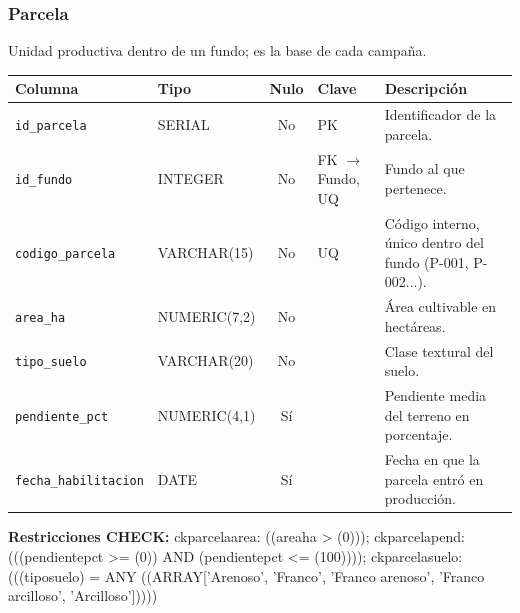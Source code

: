 \documentclass[11pt,letterpaper]{article}
\newcommand{\tbus}{\textunderscore\allowbreak}
\newcommand{\tb}[1]{{\ttfamily\let\_\tbus #1}}
\begin{document}
\subsubsection*{Parcela}
Unidad productiva dentro de un fundo; es la base de cada campaña.
{\footnotesize
\begin{longtable}{>{\raggedright\arraybackslash}p{3.3cm}>{\raggedright\arraybackslash}p{2.5cm}c>{\raggedright\arraybackslash}p{2.2cm}>{\raggedright\arraybackslash}p{6.1cm}}
\toprule
\textbf{Columna} & \textbf{Tipo} & \textbf{Nulo} & \textbf{Clave} & \textbf{Descripción} \\
\midrule
\endhead
\texttt{id\_parcela} & SERIAL & No & PK & Identificador de la parcela. \\
\texttt{id\_fundo} & INTEGER & No & FK $\to$ Fundo, UQ & Fundo al que pertenece. \\
\texttt{codigo\_parcela} & VARCHAR(15) & No & UQ & Código interno, único dentro del fundo (P-001, P-002...). \\
\texttt{area\_ha} & NUMERIC(7,2) & No &  & Área cultivable en hectáreas. \\
\texttt{tipo\_suelo} & VARCHAR(20) & No &  & Clase textural del suelo. \\
\texttt{pendiente\_pct} & NUMERIC(4,1) & Sí &  & Pendiente media del terreno en porcentaje. \\
\texttt{fecha\_habilitacion} & DATE & Sí &  & Fecha en que la parcela entró en producción. \\
\bottomrule
\end{longtable}}
{\footnotesize\raggedright\textbf{Restricciones CHECK:} \tb{ck\_parcela\_area}: \tb{((area\_ha > (0)))}; \tb{ck\_parcela\_pend}: \tb{(((pendiente\_pct >= (0)) AND (pendiente\_pct <= (100))))}; \tb{ck\_parcela\_suelo}: \tb{(((tipo\_suelo) = ANY ((ARRAY['Arenoso', 'Franco', 'Franco arenoso', 'Franco arcilloso', 'Arcilloso']))))}\par}
\medskip
\end{document}
